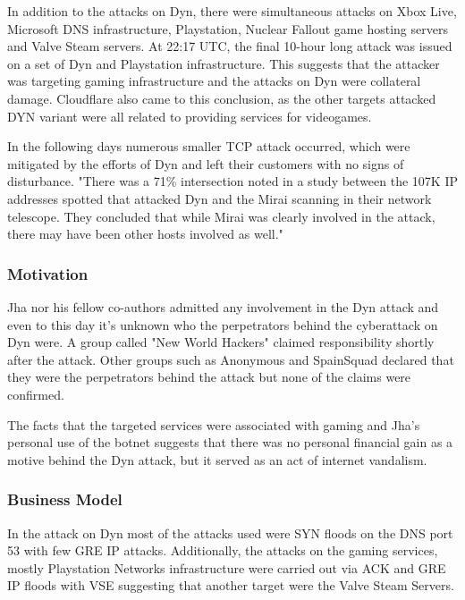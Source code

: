 In addition to the attacks on Dyn, there were simultaneous attacks on Xbox Live, Microsoft DNS infrastructure, Playstation, Nuclear Fallout game hosting servers and Valve Steam servers. At 22:17 UTC, the final 10-hour long attack was issued on a set of Dyn and Playstation infrastructure. This suggests that the attacker was targeting gaming infrastructure and the attacks on Dyn were collateral damage. Cloudflare also came to this conclusion, as the other targets attacked DYN variant were all related to providing services for videogames.

In the following days numerous smaller TCP attack occurred, which were mitigated by the efforts of Dyn and left their customers with no signs of disturbance.
"There was a 71\% intersection noted in a study between the 107K IP addresses spotted that attacked Dyn and the Mirai scanning in their network telescope. They concluded that while Mirai was clearly involved in the attack, there may have been other hosts involved as well."

		\subsubsection{Motivation}
Jha nor his fellow co-authors admitted any involvement in the Dyn attack and even to this day it's unknown who the perpetrators behind the cyberattack on Dyn were. A group called "New World Hackers" claimed responsibility shortly after the attack. Other groups such as Anonymous and SpainSquad declared that they were the perpetrators behind the attack but none of the claims were confirmed.

The facts that the targeted services were associated with gaming and Jha's personal use of the botnet suggests that there was no personal financial gain as a motive behind the Dyn attack, but it served as an act of internet vandalism.

	\subsubsection{Business Model}
In the attack on Dyn most of the attacks used were SYN floods on the DNS port 53 with few GRE IP attacks. Additionally, the attacks on the gaming services, mostly Playstation Networks infrastructure were carried out via ACK and GRE IP floods with VSE suggesting that another target were the Valve Steam Servers.

